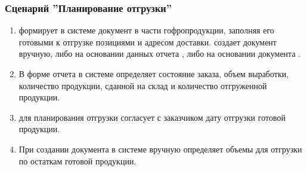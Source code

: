 \fi







\subsubsection{Сценарий ''Планирование отгрузки''}
\label{bp:goods_2}


\begin{enumerate}
    \item \manager формирует в системе \gofro документ  в части гофропродукции, заполняя его готовыми к отгрузке позициями и адресом доставки. \manager создает документ вручную, либо на основании данных отчета , либо на основании документа .
    \item В форме отчета  в системе \gofro определяет состояние заказа, объем выработки, количество продукции, сданной на склад и количество отгруженной продукции.
    \item	\manager для планирования отгрузки согласует с заказчиком дату отгрузки готовой продукции.
    \item	При создании документа в системе \gofro \manager вручную определяет объемы для отгрузки по остаткам готовой продукции.
\end{enumerate}






